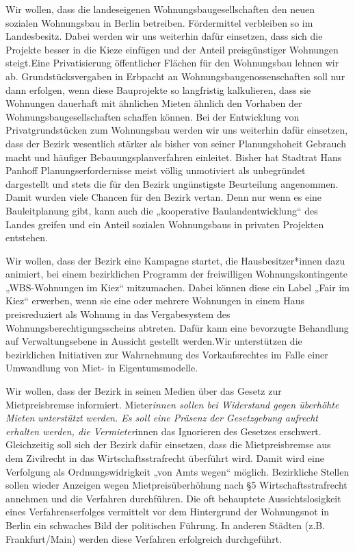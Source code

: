 \documentclass[a4paper,10pt]{article}
\begin{document}
Wir wollen, dass die landeseigenen Wohnungsbaugesellschaften den neuen
sozialen Wohnungsbau in Berlin betreiben. Fördermittel verbleiben so im
Landesbesitz. Dabei werden wir uns weiterhin dafür einsetzen, dass sich
die Projekte besser in die Kieze einfügen und der Anteil preisgünstiger
Wohnungen steigt.Eine Privatisierung öffentlicher Flächen für den
Wohnungsbau lehnen wir ab. Grundstücksvergaben in Erbpacht an
Wohnungsbaugenossenschaften soll nur dann erfolgen, wenn diese
Bauprojekte so langfristig kalkulieren, dass sie Wohnungen dauerhaft mit
ähnlichen Mieten ähnlich den Vorhaben der Wohnungsbaugesellschaften
schaffen können. Bei der Entwicklung von Privatgrundstücken zum
Wohnungsbau werden wir uns weiterhin dafür einsetzen, dass der Bezirk
wesentlich stärker als bisher von seiner Planungshoheit Gebrauch macht
und häufiger Bebauungsplanverfahren einleitet. Bisher hat Stadtrat Hans
Panhoff Planungserfordernisse meist völlig unmotiviert als unbegründet
dargestellt und stets die für den Bezirk ungünstigste Beurteilung
angenommen. Damit wurden viele Chancen für den Bezirk vertan. Denn nur
wenn es eine Bauleitplanung gibt, kann auch die „kooperative
Baulandentwicklung`` des Landes greifen und ein Anteil sozialen
Wohnungsbaus in privaten Projekten entstehen.

Wir wollen, dass der Bezirk eine Kampagne startet, die
Hausbesitzer*innen dazu animiert, bei einem bezirklichen Programm der
freiwilligen Wohnungskontingente „WBS-Wohnungen im Kiez`` mitzumachen.
Dabei können diese ein Label „Fair im Kiez`` erwerben, wenn sie eine
oder mehrere Wohnungen in einem Haus preisreduziert als Wohnung in das
Vergabesystem des Wohnungsberechtigungsscheins abtreten. Dafür kann eine
bevorzugte Behandlung auf Verwaltungsebene in Aussicht gestellt
werden.Wir unterstützen die bezirklichen Initiativen zur Wahrnehmung des
Vorkaufsrechtes im Falle einer Umwandlung von Miet- in Eigentumsmodelle.

Wir wollen, dass der Bezirk in seinen Medien über das Gesetz zur
Mietpreisbremse informiert. Mieter\emph{innen sollen bei Widerstand
gegen überhöhte Mieten unterstützt werden. Es soll eine Präsenz der
Gesetzgebung aufrecht erhalten werden, die Vermieter}innen das
Ignorieren des Gesetzes erschwert. Gleichzeitig soll sich der Bezirk
dafür einsetzen, dass die Mietpreisbremse aus dem Zivilrecht in das
Wirtschaftsstrafrecht überführt wird. Damit wird eine Verfolgung als
Ordnungswidrigkeit „von Amts wegen`` möglich. Bezirkliche Stellen sollen
wieder Anzeigen wegen Mietpreisüberhöhung nach §5 Wirtschaftsstrafrecht
annehmen und die Verfahren durchführen. Die oft behauptete
Aussichtslosigkeit eines Verfahrenserfolges vermittelt vor dem
Hintergrund der Wohnungsnot in Berlin ein schwaches Bild der politischen
Führung. In anderen Städten (z.B. Frankfurt/Main) werden diese Verfahren
erfolgreich durchgeführt.
\end{document}
